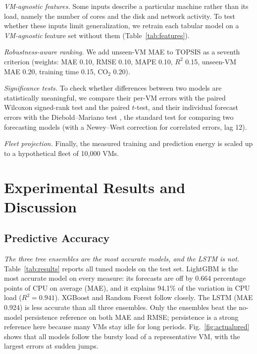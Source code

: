 \documentclass[conference,letterpaper,10pt]{IEEEtran}
\begin{document}
\textit{VM-agnostic features.} Some inputs describe a particular machine rather than its load, namely the number of cores and the disk and network activity. To test whether these inputs limit generalization, we retrain each tabular model on a \emph{VM-agnostic} feature set without them (Table~\ref{tab:features}).

\textit{Robustness-aware ranking.} We add unseen-VM MAE to TOPSIS as a seventh criterion (weights: MAE 0.10, RMSE 0.10, MAPE 0.10, $R^2$ 0.15, unseen-VM MAE 0.20, training time 0.15, CO$_2$ 0.20).

\textit{Significance tests.} To check whether differences between two models are statistically meaningful, we compare their per-VM errors with the paired Wilcoxon signed-rank test \cite{wilcoxon1945} and the paired $t$-test, and their individual forecast errors with the Diebold--Mariano test \cite{diebold1995dm}, the standard test for comparing two forecasting models (with a Newey--West correction for correlated errors, lag 12).

\textit{Fleet projection.} Finally, the measured training and prediction energy is scaled up to a hypothetical fleet of 10{,}000 VMs.

\section{Experimental Results and Discussion}
\label{sec:results}

\subsection{Predictive Accuracy}
\textit{The three tree ensembles are the most accurate models, and the LSTM is not.} Table~\ref{tab:results} reports all tuned models on the test set. LightGBM is the most accurate model on every measure: its forecasts are off by 0.664 percentage points of CPU on average (MAE), and it explains 94.1\% of the variation in CPU load ($R^2=0.941$). XGBoost and Random Forest follow closely. The LSTM (MAE 0.924) is less accurate than all three ensembles. Only the ensembles beat the no-model persistence reference on both MAE and RMSE; persistence is a strong reference here because many VMs stay idle for long periods. Fig.~\ref{fig:actualpred} shows that all models follow the bursty load of a representative VM, with the largest errors at sudden jumps.


\end{document}
